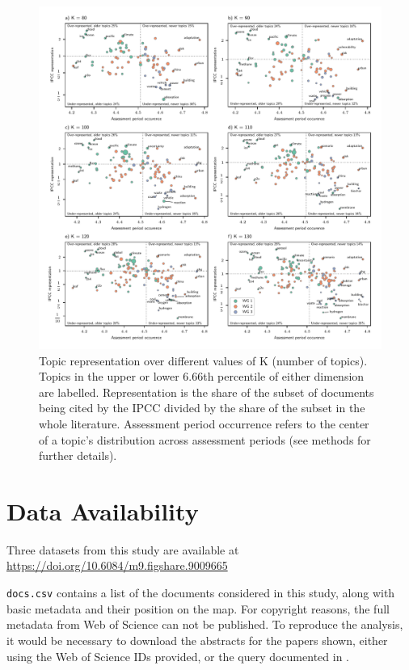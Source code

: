 \documentclass{article}
\begin{document}
	\begin{figure}
		\begin{center}
			\includegraphics[width=1\linewidth]{../plots_pub/topic_rep_ks.pdf}
			\caption{Topic representation over different values of K (number of topics). Topics in the upper or lower 6.66th percentile of either dimension are labelled. Representation is the share of the subset of documents being cited by the IPCC divided by the share of the subset in the whole literature. Assessment period occurrence refers to the center of a topic's distribution across assessment periods (see methods for further details).}
			\label{top-rep-ks}
		\end{center}
	\end{figure}
	
	\section*{Data Availability}
	
	Three datasets from this study are available at \url{https://doi.org/10.6084/m9.figshare.9009665}
	
	\medskip\noindent
	\texttt{docs.csv} contains a list of the documents considered in this study, along with basic metadata and their position on the map. For copyright reasons, the full metadata from Web of Science can not be published. To reproduce the analysis, it would be necessary to download the abstracts for the papers shown, either using the Web of Science IDs provided, or the query documented in \cite{Grieneisen2011}.
	
\end{document}
